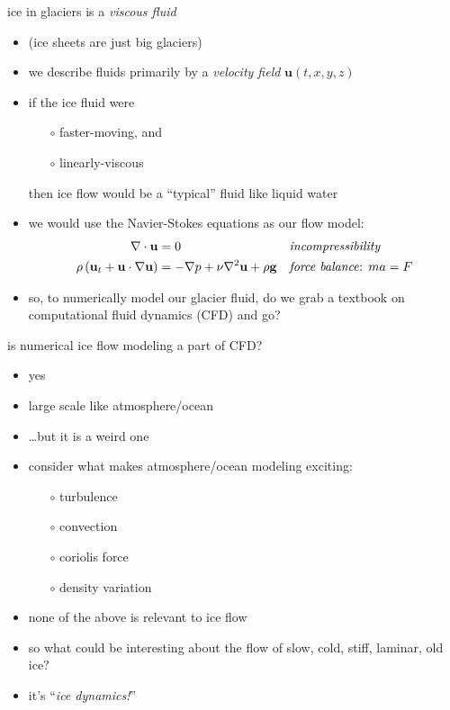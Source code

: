 \documentclass[hide notes,intlimits]{beamer}
\begin{document}
\begin{frame}{ice in glaciers is a \emph{viscous fluid}}

\begin{itemize}
\item (ice sheets are just big glaciers)
\item we describe fluids primarily by a \emph{velocity field} $\mathbf{u}(t,x,y,z)$
\item if the ice fluid were
  \begin{itemize}
  \item[$\circ$] faster-moving, and
  \item[$\circ$] linearly-viscous
  \end{itemize}
  
  then ice flow would be a ``typical'' fluid like liquid water
\item we would use the Navier-Stokes equations as our flow model:
\begin{align*}
\nabla \cdot \mathbf{u} &= 0 &&\text{\emph{incompressibility}} \\
\rho \left(\mathbf{u}_t + \mathbf{u}\cdot\nabla \mathbf{u}\right) &= -\nabla p + \nu \nabla^2 \mathbf{u} + \rho \mathbf{g} &&\text{\emph{force balance}:  $ma=F$}
\end{align*}
\item so, to numerically model our glacier fluid, do we grab a textbook on computational fluid dynamics (CFD) and go?
\end{itemize}
\end{frame}


\begin{frame}{is numerical ice flow modeling a part of CFD?}

\begin{itemize}
\item \alert{yes}
\item large scale like atmosphere/ocean
\item \dots but it is a weird one
\item consider what makes atmosphere/ocean modeling exciting:
  \begin{itemize}
  \item[$\circ$] turbulence
  \item[$\circ$] convection
  \item[$\circ$] coriolis force
  \item[$\circ$] density variation
  \end{itemize}
\item none of the above is relevant to ice flow
\item so what could be interesting about the flow of slow, cold, stiff, laminar, old ice?
\item it's ``\emph{ice dynamics!}''
\end{itemize}
\end{frame}
\end{document}
